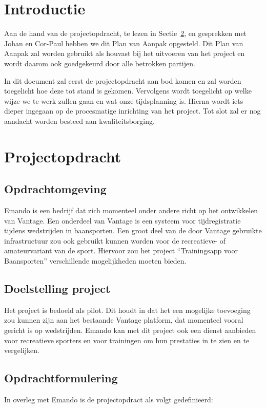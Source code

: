 \section{Introductie}


Aan de hand van de projectopdracht, te lezen in Sectie~\ref{sec:projectopdracht}, en gesprekken met Johan en Cor-Paul hebben we dit Plan van Aanpak opgesteld. Dit Plan van Aanpak zal worden gebruikt als houvast bij het uitvoeren van het project en wordt daarom ook goedgekeurd door alle betrokken partijen.

In dit document zal eerst de projectopdracht aan bod komen en zal worden toegelicht hoe deze tot stand is gekomen. Vervolgens wordt toegelicht op welke wijze we te werk zullen gaan en wat onze tijdsplanning is. Hierna wordt iets dieper ingegaan op de procesmatige inrichting van het project. Tot slot zal er nog aandacht worden besteed aan kwaliteitsborging.

\section{Projectopdracht}
\label{sec:projectopdracht}
\subsection{Opdrachtomgeving}

Emando is een bedrijf dat zich momenteel onder andere richt op het ontwikkelen van Vantage. Een onderdeel van Vantage is een systeem voor tijdregistratie tijdens wedstrijden in baansporten. Een groot deel van de door Vantage gebruikte infrastructuur zou ook gebruikt kunnen worden voor de recreatieve- of amateurvariant van de sport. Hiervoor zou het project ``Trainingsapp voor Baansporten'' verschillende mogelijkheden moeten bieden.

\subsection{Doelstelling project}
Het project is bedoeld als pilot. Dit houdt in dat het een mogelijke toevoeging zou kunnen zijn aan het bestaande Vantage platform, dat momenteel vooral gericht is op wedstrijden. Emando kan met dit project ook een dienst aanbieden voor recreatieve sporters en voor trainingen om hun prestaties in te zien en te vergelijken.

\subsection{Opdrachtformulering}
In overleg met Emando is de projectopdract als volgt gedefinieerd:

